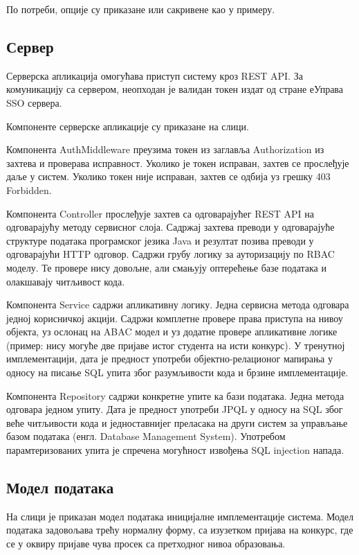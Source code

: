 \documentclass[a4paper]{article}
\begin{document}
По потреби, опције су приказане или сакривене као у примеру.

\subsection*{Сервер}

Серверска апликација омогућава приступ систему кроз REST API. За комуникацију са сервером, неопходан је валидан токен издат од стране еУправа SSO сервера.

Компоненте серверске апликације су приказане на слици.

Компонента AuthMiddleware преузима токен из заглавља Authorization из захтева и проверава исправност. Уколико је токен 
исправан, захтев се прослеђује даље у систем. Уколико токен није исправан, захтев се одбија уз грешку 403 Forbidden.

Компонента Controller прослеђује захтев са одговарајућег REST API на одговарајућу методу сервисног слоја. Садржај
захтева преводи у одговарајуће структуре података програмског језика Java и резултат позива преводи у одговарајући HTTP одговор. Садржи грубу логику за ауторизацију по RBAC моделу. Те провере нису довољне, али смањују оптерећење базе података и олакшавају читљивост кода.

Компонента Service садржи апликативну логику. Једна сервисна метода одговара једној корисничкој акцији. Садржи комплетне
провере права приступа на нивоу објекта, уз ослонац на ABAC модел и уз додатне провере апликативне логике
(пример: нису могуће две пријаве истог студента на исти конкурс). У тренутној имплементацији, дата је предност употреби
објектно-релационог мапирања у односу на писање SQL упита због разумљивости кода и брзине имплементације.

Компонента Repository садржи конкретне упите ка бази података. Једна метода одговара једном упиту. Дата је предност
употреби JPQL у односу на SQL због веће читљивости кода и једноставнијег преласака на други систем за управљање базом података (енгл. Database Management System). Употребом парамтеризованих упита је спречена могућност извођења SQL injection напада.

\subsection*{Модел података}

На слици је приказан модел података иницијалне имплементације система. Модел података задовољава трећу нормалну форму, са
изузетком пријава на конкурс, где се у оквиру пријаве чува просек са претходног нивоа образовања.
\end{document}
